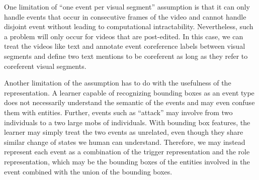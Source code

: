 \documentclass[11pt,a4paper]{article}
\begin{document}
One limitation of ``one event per visual segment'' assumption is that it can only handle events that occur in consecutive frames of the video and cannot handle disjoint event without leading to computational intractability. Nevertheless, such a problem will only occur for videos that are post-edited. In this case, we can treat the videos like text and annotate event coreference labels between visual segments and define two text mentions to be coreferent as long as they refer to coreferent visual segments. 

Another limitation of the assumption has to do with the usefulness of the representation. A learner capable of recognizing bounding boxes as an event type does not necessarily understand the semantic of the events and may even confuse them with entities. Further, events such as ``attack'' may involve from two individuals to a two large mobs of individuals. With bounding box features, the learner may simply treat the two events as unrelated, even though they share similar change of states we human can understand. Therefore, we may instead represent each event as a combination of the trigger representation and the role representation, which may be the bounding boxes of the entities involved in the event combined with the union of the bounding boxes.





\appendix
\end{document}
